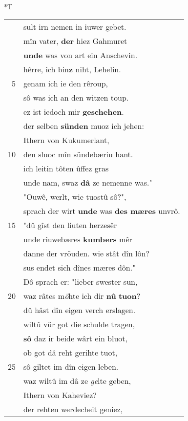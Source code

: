 \documentclass[8pt,a4paper,notitlepage]{article}
\begin{document}
\begin{table}[ht]
\begin{minipage}[t]{0.5\linewidth}
\end{minipage}
\hspace{0.5cm}
\begin{minipage}[t]{0.5\linewidth}
\small
\begin{center}*T
\end{center}
\begin{tabular}{rl}
 & sult irn nemen in iuwer gebet.\\ 
 & mîn vater, \textbf{der} hiez Gahmuret\\ 
 & \textbf{unde} was von art ein Anschevin.\\ 
 & hêrre, ich bin\textbf{z} niht, Lehelin.\\ 
5 & genam ich ie den rêroup,\\ 
 & sô was ich an den witzen toup.\\ 
 & ez ist iedoch mir \textbf{geschehen}.\\ 
 & der selben \textbf{sünden} muoz ich jehen:\\ 
 & Ithern von Kukumerlant,\\ 
10 & den sluoc mîn sündebæriu hant.\\ 
 & ich leitin tôten ûffez gras\\ 
 & unde nam, swaz \textbf{dâ} ze nemenne was."\\ 
 & "Ouwê, werlt, wie tuostû sô?",\\ 
 & sprach der wirt \textbf{unde} was \textbf{des mæres} unvrô.\\ 
15 & "dû gîst den liuten herzesêr\\ 
 & unde riuwebæres \textbf{kumbers} mêr\\ 
 & danne der vröuden. wie stât dîn lôn?\\ 
 & sus endet sich dînes mæres dôn."\\ 
 & Dô sprach er: "lieber swester sun,\\ 
20 & waz râtes m\textit{ö}hte ich dir \textbf{nû} \textbf{tuon}?\\ 
 & dû hâst dîn eigen verch erslagen.\\ 
 & wiltû vür got die schulde tragen,\\ 
 & \textbf{sô} daz ir beide wârt ein bluot,\\ 
 & ob got dâ reht gerihte tuot,\\ 
25 & sô giltet im dîn eigen leben.\\ 
 & waz wiltû im dâ ze \textit{ge}lte geben,\\ 
 & Ithern von Kaheviez?\\ 
 & der rehten werdecheit geniez,\\ 

\end{tabular}
\end{minipage}
\end{table}
\end{document}
